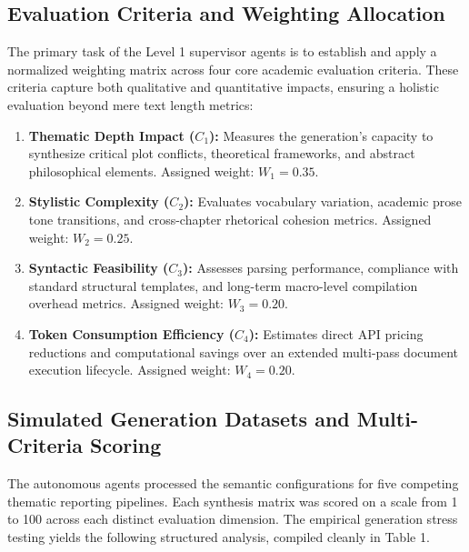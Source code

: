 \subsection{Evaluation Criteria and Weighting Allocation}
The primary task of the Level 1 supervisor agents is to establish and apply a normalized weighting matrix across four core academic evaluation criteria. These criteria capture both qualitative and quantitative impacts, ensuring a holistic evaluation beyond mere text length metrics:
\begin{enumerate}
    \item \textbf{Thematic Depth Impact ($C_{1}$):} Measures the generation's capacity to synthesize critical plot conflicts, theoretical frameworks, and abstract philosophical elements. Assigned weight: $W_{1} = 0.35$.
    \item \textbf{Stylistic Complexity ($C_{2}$):} Evaluates vocabulary variation, academic prose tone transitions, and cross-chapter rhetorical cohesion metrics. Assigned weight: $W_{2} = 0.25$.
    \item \textbf{Syntactic Feasibility ($C_{3}$):} Assesses parsing performance, compliance with standard structural templates, and long-term macro-level compilation overhead metrics. Assigned weight: $W_{3} = 0.20$.
    \item \textbf{Token Consumption Efficiency ($C_{4}$):} Estimates direct API pricing reductions and computational savings over an extended multi-pass document execution lifecycle. Assigned weight: $W_{4} = 0.20$.
\end{enumerate}

\subsection{Simulated Generation Datasets and Multi-Criteria Scoring}
The autonomous agents processed the semantic configurations for five competing thematic reporting pipelines. Each synthesis matrix was scored on a scale from 1 to 100 across each distinct evaluation dimension. The empirical generation stress testing yields the following structured analysis, compiled cleanly in Table 1.

